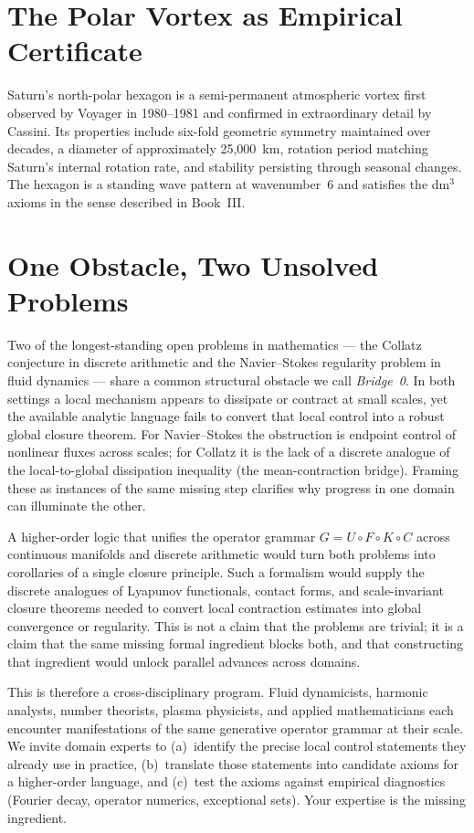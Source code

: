 \documentclass[11pt]{article}
\begin{document}
\section{The Polar Vortex as Empirical Certificate}

Saturn's north-polar hexagon is a semi-permanent atmospheric vortex first observed by Voyager in
1980--1981 and confirmed in extraordinary detail by Cassini. Its properties include six-fold
geometric symmetry maintained over decades, a diameter of approximately 25,000~km, rotation period
matching Saturn's internal rotation rate, and stability persisting through seasonal changes. The
hexagon is a standing wave pattern at wavenumber~6 and satisfies the dm$^3$ axioms in the sense
described in Book~III.

\section{One Obstacle, Two Unsolved Problems}

Two of the longest-standing open problems in mathematics --- the Collatz conjecture in discrete
arithmetic and the Navier--Stokes regularity problem in fluid dynamics --- share a common
structural obstacle we call \emph{Bridge~0}. In both settings a local mechanism appears to
dissipate or contract at small scales, yet the available analytic language fails to convert that
local control into a robust global closure theorem. For Navier--Stokes the obstruction is endpoint
control of nonlinear fluxes across scales; for Collatz it is the lack of a discrete analogue of the
local-to-global dissipation inequality (the mean-contraction bridge). Framing these as instances
of the same missing step clarifies why progress in one domain can illuminate the other.

A higher-order logic that unifies the operator grammar $G = U \circ F \circ K \circ C$ across
continuous manifolds and discrete arithmetic would turn both problems into corollaries of a single
closure principle. Such a formalism would supply the discrete analogues of Lyapunov functionals,
contact forms, and scale-invariant closure theorems needed to convert local contraction estimates
into global convergence or regularity. This is not a claim that the problems are trivial; it is a
claim that the same missing formal ingredient blocks both, and that constructing that ingredient
would unlock parallel advances across domains.

This is therefore a cross-disciplinary program. Fluid dynamicists, harmonic analysts, number
theorists, plasma physicists, and applied mathematicians each encounter manifestations of the same
generative operator grammar at their scale. We invite domain experts to (a)~identify the precise
local control statements they already use in practice, (b)~translate those statements into candidate
axioms for a higher-order language, and (c)~test the axioms against empirical diagnostics (Fourier
decay, operator numerics, exceptional sets). Your expertise is the missing ingredient.
\end{document}
